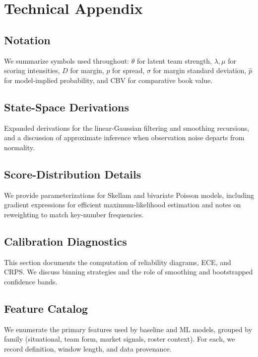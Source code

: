 \documentclass[12pt]{report}  %
\numberwithin{equation}{section}
\theoremstyle{plain}
\theoremstyle{definition}
\theoremstyle{remark}
\begin{document}
\appendix
\makeatletter
\renewcommand\thechapter{\AlphAlph{\value{chapter}}}
\makeatother
\chapter{Technical Appendix}
\section{Notation}
We summarize symbols used throughout: $\theta$ for latent team strength, $\lambda,\mu$ for scoring intensities, $D$ for margin, $p$ for spread, $\sigma$ for margin standard deviation, $\hat p$ for model-implied probability, and CBV for comparative book value.

\section{State-Space Derivations}
Expanded derivations for the linear-Gaussian filtering and smoothing recursions, and a discussion of approximate inference when observation noise departs from normality.

\section{Score-Distribution Details}
We provide parameterizations for Skellam and bivariate Poisson models, including gradient expressions for efficient maximum-likelihood estimation and notes on reweighting to match key-number frequencies.

\section{Calibration Diagnostics}
This section documents the computation of reliability diagrams, ECE, and CRPS. We discuss binning strategies and the role of smoothing and bootstrapped confidence bands.

\section{Feature Catalog}
We enumerate the primary features used by baseline and ML models, grouped by family (situational, team form, market signals, roster context). For each, we record definition, window length, and data provenance.
\end{document}
